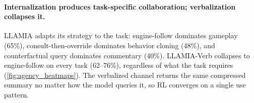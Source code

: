\paragraph{Internalization produces task-specific collaboration; verbalization collapses it.}
LLAMIA adapts its strategy to the task: engine-follow dominates gameplay (65\%), consult-then-override dominates behavior cloning (48\%), and counterfactual query dominates commentary (40\%). LLAMIA-Verb collapses to engine-follow on every task (62--76\%), regardless of what the task requires (\cref{fig:agency_heatmaps}). The verbalized channel returns the same compressed summary no matter how the model queries it, so RL converges on a single use pattern.




